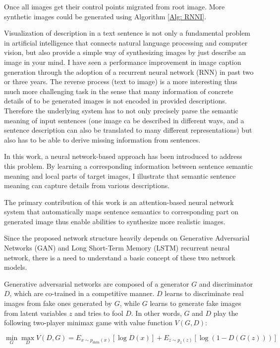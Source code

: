 \documentclass{iitthesis}
\begin{document}
Once all images get their control points migrated from root image. More synthetic images could be generated using Algorithm \ref{Alg: RNNI}.

 Visualization of description in a text sentence is not only a fundamental problem in artificial intelligence that connects natural language processing and computer vision, but also provide a simple way of synthesizing images by just describe an image in your mind. I have seen a performance improvement in image caption generation through the adoption of a recurrent neural network (RNN) in past two or three years. The reverse process (text to image) is a more interesting thus much more challenging task in the sense that many information of concrete details of to be generated images is not encoded in provided descriptions. Therefore the underlying system has to not only precisely parse the semantic meaning of input sentences (one image ca be described in different ways, and a sentence description can also be translated to many different representations) but also has to be able to derive missing information from sentences. 

In this work, a neural network-based approach has been introduced to address this problem. By learning a corresponding information between sentence semantic meaning and local parts of target images, I illustrate that semantic sentence meaning can capture details from various descriptions. 

The primary contribution of this work is an attention-based neural network system that automatically maps sentence semantics to corresponding part on generated image thus enable abilities to synthesize more realistic images.

Since the proposed network structure heavily depends on Generative Adversarial Networks (GAN) and Long Short-Term Memory (LSTM) recurrent neural network, there is a need to understand a basic concept of these two network models.

 Generative adversarial networks are composed of a generator $G$ and discriminator $D$, which are co-trained in a competitive manner. $D$ learns to discriminate real images from fake ones generated by $G$, while $G$ learns to generate fake images from latent variables $z$ and tries to fool $D$. In other words, $G$ and $D$ play the following two-player minimax game with value function $V(G, D)$:

\begin{equation}
\min_{G}\max_{D}V(D, G) = E_{x\sim p_{data}(x)}\left[ \log{D(x)}\right] + E_{z\sim p_{z}(z)}\left[\log(1-D(G(z))) \right]
\end{equation} 
\end{document}
